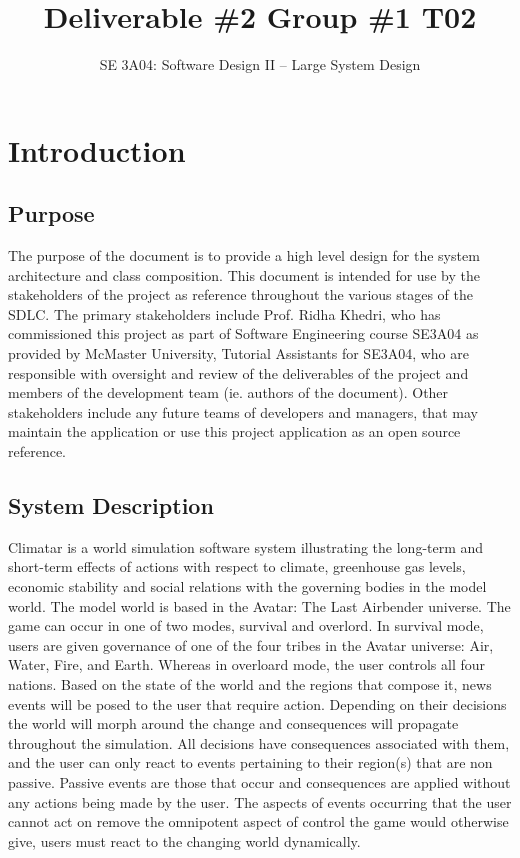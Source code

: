 \documentclass[]{article}
\title{Deliverable \#2 Group \#1 T02}
\author{SE 3A04: Software Design II -- Large System Design}
\date{}
\begin{document}
\maketitle

\section{Introduction}
\label{sec:introduction}

\subsection{Purpose}
\label{sub:purpose}
The purpose of the document is to provide a high level design for the system architecture and class composition. This document is intended for use by the stakeholders of the project as reference throughout the various stages of the SDLC. The primary stakeholders include Prof. Ridha Khedri, who has commissioned this project as part of Software Engineering course SE3A04 as provided by McMaster University, Tutorial Assistants for SE3A04, who are responsible with oversight and review of the deliverables of the project and members of the development team (ie. authors of the document). Other stakeholders include any future teams of developers and managers, that may maintain the application or use this project application as an open source reference.


\subsection{System Description}
\label{sub:system_description}
Climatar is a world simulation software system illustrating the long-term and short-term effects of actions with respect to climate, greenhouse gas levels, economic stability and social relations with the governing bodies in the model world. The model world is based in the Avatar: The Last Airbender universe. 
The game can occur in one of two modes, survival and overlord. In survival mode, users are given governance of one of the four tribes in the Avatar universe: Air, Water, Fire, and Earth. Whereas in overloard mode, the user controls all four nations. Based on the state of the world and the regions that compose it, news events will be posed to the user that require action. Depending on their decisions the world will morph around the change and consequences will propagate throughout the simulation. All decisions have consequences associated with them, and the user can only react to events pertaining to their region(s) that are non passive. Passive events are those that occur and consequences are applied without any actions being made by the user. The aspects of events occurring that the user cannot act on remove the omnipotent aspect of control the game would otherwise give, users must react to the changing world dynamically.
\end{document}
